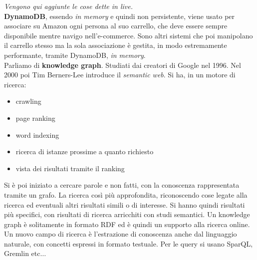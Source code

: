 \documentclass[a4paper,12pt, oneside]{book}
\begin{document}
\begin{shaded}
  \textit{Vengono qui aggiunte le cose dette in live.}\\
  \textbf{DynamoDB}, essendo \textit{in memory} e quindi non persistente, viene
  usato per associare su Amazon ogni persona al suo carrello, che deve essere
  sempre disponibile mentre navigo nell'e-commerce. Sono altri sistemi che poi
  manipolano il carrello stesso ma la sola associazione è gestita, in modo
  estremamente performante, tramite DynamoDB, \textit{in memory}.\\
  Parliamo di \textbf{knowledge graph}. Studiati dai creatori di Google nel
  1996. Nel 2000 poi Tim Berners-Lee introduce il \textit{semantic web}. Si ha,
  in un motore di ricerca:
  \begin{itemize}
    \item crawling  
    \item page ranking
    \item word indexing
    \item ricerca di istanze prossime a quanto richiesto
    \item vista dei risultati tramite il ranking
  \end{itemize}
  Si è poi iniziato a cercare parole e non fatti, con la conoscenza
  rappresentata tramite un grafo. La ricerca così più approfondita, riconoscendo
  cose legate alla ricerca ed eventuali altri risultati simili o di
  interesse. Si hanno quindi risultati più specifici, con risultati di ricerca
  arricchiti con studi semantici. Un knowledge graph è solitamente in formato
  RDF ed è quindi un supporto alla ricerca online. Un nuovo campo di ricerca è
  l'estrazione di conoscenza anche dal linguaggio naturale, con concetti
  espressi in formato testuale. Per le query si usano SparQL, Gremlin
  etc$\ldots$
\end{shaded}
\end{document}
